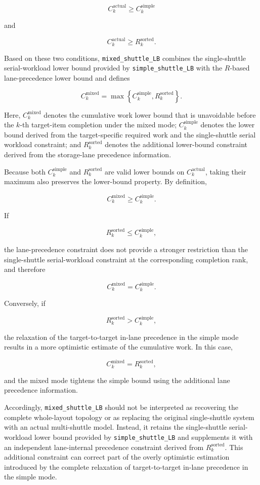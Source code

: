 \[
C_k^{\mathrm{actual}}
\geq
C_k^{\mathrm{simple}}
\]

and

\[
C_k^{\mathrm{actual}}
\geq
R_k^{\mathrm{sorted}}.
\]

Based on these two conditions, \texttt{mixed\_shuttle\_LB} combines the
single-shuttle serial-workload lower bound provided by
\texttt{simple\_shuttle\_LB} with the \(R\)-based lane-precedence lower bound
and defines

\begin{equation}
C_k^{\mathrm{mixed}}
=
\max
\left\{
C_k^{\mathrm{simple}},
R_k^{\mathrm{sorted}}
\right\}.    
\end{equation}

Here, \(C_k^{\mathrm{mixed}}\) denotes the cumulative work lower bound that is
unavoidable before the \(k\)-th target-item completion under the mixed mode;
\(C_k^{\mathrm{simple}}\) denotes the lower bound derived from the
target-specific required work and the single-shuttle serial workload
constraint; and \(R_k^{\mathrm{sorted}}\) denotes the additional lower-bound
constraint derived from the storage-lane precedence information.

Because both \(C_k^{\mathrm{simple}}\) and \(R_k^{\mathrm{sorted}}\) are valid
lower bounds on \(C_k^{\mathrm{actual}}\), taking their maximum also preserves
the lower-bound property. By definition,

\[
C_k^{\mathrm{mixed}}
\geq
C_k^{\mathrm{simple}}.
\]

If

\[
R_k^{\mathrm{sorted}}
\leq
C_k^{\mathrm{simple}},
\]

the lane-precedence constraint does not provide a stronger restriction than the
single-shuttle serial-workload constraint at the corresponding completion
rank, and therefore

\[
C_k^{\mathrm{mixed}}
=
C_k^{\mathrm{simple}}.
\]

Conversely, if

\[
R_k^{\mathrm{sorted}}
>
C_k^{\mathrm{simple}},
\]

the relaxation of the target-to-target in-lane precedence in the simple mode
results in a more optimistic estimate of the cumulative work. In this case,

\[
C_k^{\mathrm{mixed}}
=
R_k^{\mathrm{sorted}},
\]

and the mixed mode tightens the simple bound using the additional lane
precedence information.

Accordingly, \texttt{mixed\_shuttle\_LB} should not be interpreted as
recovering the complete whole-layout topology or as replacing the original
single-shuttle system with an actual multi-shuttle model. Instead, it retains
the single-shuttle serial-workload lower bound provided by
\texttt{simple\_shuttle\_LB} and supplements it with an independent
lane-internal precedence constraint derived from
\(R_k^{\mathrm{sorted}}\). This additional constraint can correct part of the
overly optimistic estimation introduced by the complete relaxation of
target-to-target in-lane precedence in the simple mode.

